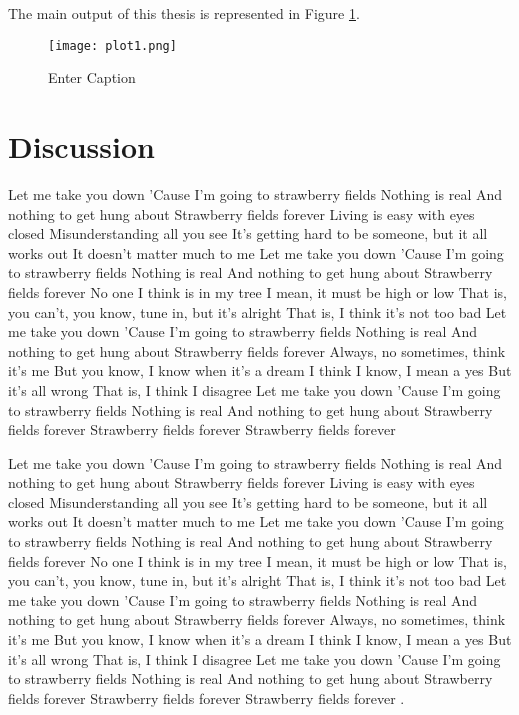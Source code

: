 \documentclass[12pt]{article}
\begin{document}
The main output of this thesis is represented in Figure \ref{fig:output}.

\begin{figure}
    \centering
    \texttt{[image: plot1.png]}
    \caption{Enter Caption}
    \label{fig:output}
\end{figure}

\section{Discussion}

Let me take you down
'Cause I'm going to strawberry fields
Nothing is real
And nothing to get hung about
Strawberry fields forever
Living is easy with eyes closed
Misunderstanding all you see
It's getting hard to be someone, but it all works out
It doesn't matter much to me
Let me take you down
'Cause I'm going to strawberry fields
Nothing is real
And nothing to get hung about
Strawberry fields forever
No one I think is in my tree
I mean, it must be high or low
That is, you can't, you know, tune in, but it's alright
That is, I think it's not too bad
Let me take you down
'Cause I'm going to strawberry fields
Nothing is real
And nothing to get hung about
Strawberry fields forever
Always, no sometimes, think it's me
But you know, I know when it's a dream
I think I know, I mean a yes
But it's all wrong
That is, I think I disagree
Let me take you down
'Cause I'm going to strawberry fields
Nothing is real
And nothing to get hung about
Strawberry fields forever
Strawberry fields forever
Strawberry fields forever

Let me take you down
'Cause I'm going to strawberry fields
Nothing is real
And nothing to get hung about
Strawberry fields forever
Living is easy with eyes closed
Misunderstanding all you see
It's getting hard to be someone, but it all works out
It doesn't matter much to me
Let me take you down
'Cause I'm going to strawberry fields
Nothing is real
And nothing to get hung about
Strawberry fields forever
No one I think is in my tree
I mean, it must be high or low
That is, you can't, you know, tune in, but it's alright
That is, I think it's not too bad
Let me take you down
'Cause I'm going to strawberry fields
Nothing is real
And nothing to get hung about
Strawberry fields forever
Always, no sometimes, think it's me
But you know, I know when it's a dream
I think I know, I mean a yes
But it's all wrong
That is, I think I disagree
Let me take you down
'Cause I'm going to strawberry fields
Nothing is real
And nothing to get hung about
Strawberry fields forever
Strawberry fields forever
Strawberry fields forever \cite{Massol2011}.
\end{document}
